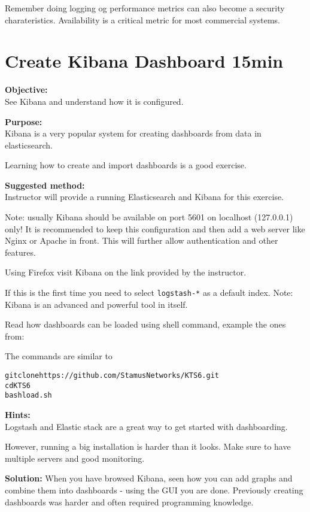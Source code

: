 \documentclass[a4paper,11pt,notitlepage]{report}
\begin{document}
Remember doing logging og performance metrics can also become a security charateristics. Availability is a critical metric for most commercial systems.


\chapter{Create Kibana Dashboard 15min}
\label{ex:kibana-dashboard}


{\bf Objective:}\\
See Kibana and understand how it is configured.

{\bf Purpose:}\\
Kibana is a very popular system for creating dashboards from data in elasticsearch.

Learning how to create and import dashboards is a good exercise.

{\bf Suggested method:}\\
Instructor will provide a running Elasticsearch and Kibana for this exercise.

Note: usually Kibana should be available on port 5601 on localhost (127.0.0.1) only! It is recommended to keep this configuration and then add a web server like Nginx or Apache in front. This will further allow authentication and other features.

Using Firefox visit Kibana on the link provided by the instructor.

If this is the first time you need to
 select \verb+logstash-*+ as a default index. Note: Kibana is an advanced and powerful tool in itself.

Read how dashboards can be loaded using shell command, example the ones from:

The commands are similar to
\begin{alltt}
git clone https://github.com/StamusNetworks/KTS6.git
cd KTS6
bash load.sh
\end{alltt}

{\bf Hints:}\\
Logstash and Elastic stack are a great way to get started with dashboarding.

However, running a big installation is harder than it looks. Make sure to have multiple servers and good monitoring.

{\bf Solution:}
When you have browsed Kibana, seen how you can add graphs and combine them into dashboards - using the GUI you are done. Previously creating dashboards was harder and often required programming knowledge.
\end{document}
